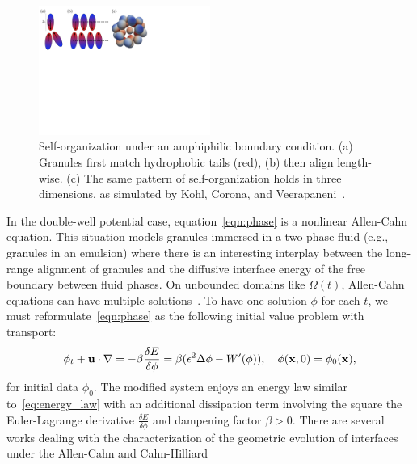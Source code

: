 \begin{figure}
  \vspace{-8pt}
  \centerline{\includegraphics[width=0.5\textwidth]{figures/SA1Figures/AmphiphilicAssembly.pdf}}
  \vspace{-8pt}
  \caption{\label{fig:amphiphilic_assembly} \footnotesize
  Self-organization under an amphiphilic boundary condition. (a)
  Granules first match hydrophobic tails (red), (b) then align
  length-wise. (c) The same pattern of self-organization holds in three
  dimensions, as simulated by Kohl, Corona, and
  Veerapaneni~\cite{koh-cor-che-vee2021}.}
\end{figure}
In the double-well potential case, equation~\eqref{eqn:phase} is a
nonlinear Allen-Cahn equation. This situation models granules immersed
in a two-phase fluid (e.g., granules in an emulsion) where there is an
interesting interplay between the long-range alignment of granules and
the diffusive interface energy of the free boundary between fluid
phases. On unbounded domains like $\Omega(t)$, Allen-Cahn equations can
have multiple solutions~\cite{Alama1997StationaryLS,
Alikakos2008OnAE, Bronsard1993OnTB, Byeon2014SolutionsOH, Byeon2013OnAP,
Alessio2005ENTIRESI, Trumper2007ExistenceOA, Benci2019MultipleSF}.
To have one solution $\phi$ for each $t$, 
we must reformulate~\eqref{eqn:phase} as
the following initial value problem with transport:
\begin{align}
  \label{eqn:phase_transport}
  \phi_t + \mathbf{u} \cdot \nabla
  = -\beta \frac{\delta E}{\delta \phi}
  = \beta(\epsilon^2 \Delta \phi - W'(\phi)),
  \quad \phi(\mathbf{x},0) = \phi_0(\mathbf{x}),
\end{align}
for initial data $\phi_0$. The modified system enjoys an energy law
similar to~\eqref{eq:energy_law} with an additional dissipation term
involving the square the Euler-Lagrange derivative $\frac{\delta
E}{\delta \phi}$ and dampening factor $\beta > 0$. There are several
works dealing with the characterization of the geometric evolution of
interfaces under the Allen-Cahn and Cahn-Hilliard
